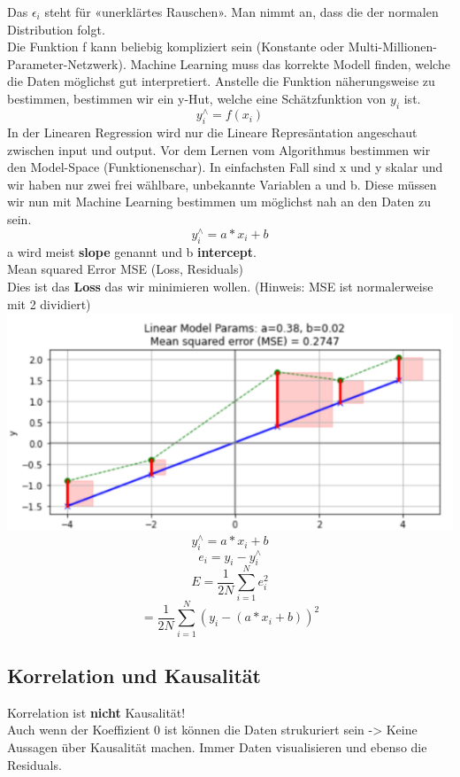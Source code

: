 Das $\epsilon_i$ steht für «unerklärtes Rauschen». Man nimmt an, dass die der normalen Distribution folgt.\\
Die Funktion f kann beliebig kompliziert sein (Konstante oder Multi-Millionen-Parameter-Netzwerk). Machine Learning muss das korrekte Modell finden, welche die Daten möglichst gut interpretiert. Anstelle die Funktion näherungsweise zu bestimmen, bestimmen wir ein y-Hut, welche eine Schätzfunktion von $y_i$ ist.
$$y^\wedge_{i} = f(x_i)$$
In der Linearen Regression wird nur die Lineare Represäntation angeschaut zwischen input und output. Vor dem Lernen vom Algorithmus bestimmen wir den Model-Space (Funktionenschar). In einfachsten Fall sind x und y skalar und wir haben nur zwei frei wählbare, unbekannte Variablen a und b. Diese müssen wir nun mit Machine Learning bestimmen um möglichst nah an den Daten zu sein.
$$y^\wedge_{i} = a * x_i + b$$
a wird meist \textbf{slope} genannt und b \textbf{intercept}.\\
\textcolor{myblue}{Mean squared Error MSE (Loss, Residuals)}\\
Dies ist das \textbf{Loss} das wir minimieren wollen. (Hinweis: MSE ist normalerweise mit 2 dividiert)
\includegraphics[width=\linewidth]{img/mse.png}
$$y^\wedge_{i} = a * x_i + b$$
$$e_i=y_i-y^\wedge_{i}$$
$$E=\frac{1}{2N}\sum_{i=1}^N e^2_i$$
$$=\frac{1}{2N}\sum_{i=1}^N(y_i-(a * x_i + b))^2$$
\subsection{Korrelation und Kausalität}
Korrelation ist \textbf{nicht} Kausalität!\\
Auch wenn der Koeffizient 0 ist können die Daten strukuriert sein -> Keine Aussagen über Kausalität machen. Immer Daten visualisieren und ebenso die Residuals.
